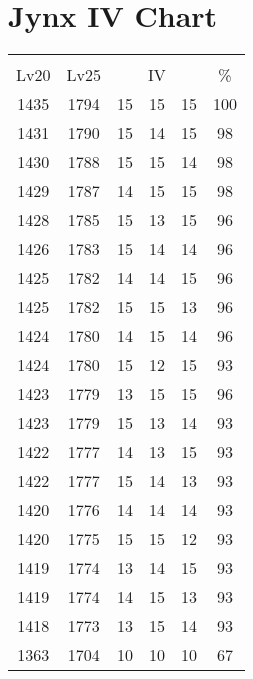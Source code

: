 \documentclass{article}%
\begin{document}
%
\normalsize%
\section{Jynx IV Chart}%
\label{sec:Jynx IV Chart}%
\renewcommand{\arraystretch}{1.5}%
\begin{tabular}{|c|c|c|c|c|c|}%
\hline%
\multicolumn{6}{|c|}{\textcolor{white}{ 
\linebreak{Jynx}
}%
\cellcolor{black}}\\%
\multicolumn{1}{|c}{Lv20}&\multicolumn{1}{c|}{Lv25}&\multicolumn{3}{c|}{IV}&\multicolumn{1}{|c|}{\%}\\%
\hline%
\rowcolor{color100}%
1435&1794&15&15&15&100\\%
\hline%
\rowcolor{color98}%
1431&1790&15&14&15&98\\%
\hline%
\rowcolor{color98}%
1430&1788&15&15&14&98\\%
\hline%
\rowcolor{color98}%
1429&1787&14&15&15&98\\%
\hline%
\rowcolor{color96}%
1428&1785&15&13&15&96\\%
\hline%
\rowcolor{color96}%
1426&1783&15&14&14&96\\%
\hline%
\rowcolor{color96}%
1425&1782&14&14&15&96\\%
\hline%
\rowcolor{color96}%
1425&1782&15&15&13&96\\%
\hline%
\rowcolor{color96}%
1424&1780&14&15&14&96\\%
\hline%
\rowcolor{color93}%
1424&1780&15&12&15&93\\%
\hline%
\rowcolor{color96}%
1423&1779&13&15&15&96\\%
\hline%
\rowcolor{color93}%
1423&1779&15&13&14&93\\%
\hline%
\rowcolor{color93}%
1422&1777&14&13&15&93\\%
\hline%
\rowcolor{color93}%
1422&1777&15&14&13&93\\%
\hline%
\rowcolor{color93}%
1420&1776&14&14&14&93\\%
\hline%
\rowcolor{color93}%
1420&1775&15&15&12&93\\%
\hline%
\rowcolor{color93}%
1419&1774&13&14&15&93\\%
\hline%
\rowcolor{color93}%
1419&1774&14&15&13&93\\%
\hline%
\rowcolor{color93}%
1418&1773&13&15&14&93\\%
\hline%
\rowcolor{color91}%
1363&1704&10&10&10&67\\%
\end{tabular}

%
\end{document}
